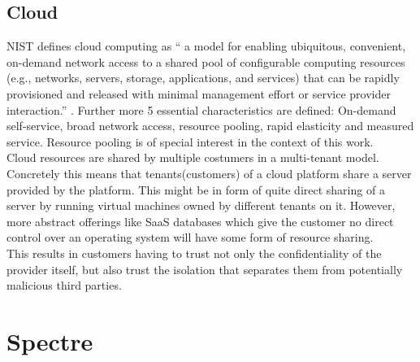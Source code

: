 \documentclass[conference,compsoc,final,a4paper]{IEEEtran}
\begin{document}
\subsection{Cloud}
NIST defines cloud computing as \enquote{\textelp{} a model for enabling ubiquitous, convenient, on-demand network access to a shared pool of configurable computing resources (e.g., networks, servers, storage, applications, and services) that can be rapidly provisioned and released with minimal management effort or service provider interaction.} \textcite{mell2011nist}. Further more 5 essential characteristics are defined: On-demand self-service, broad network access, resource pooling, rapid   elasticity and measured service. Resource pooling is of special interest in the context of this work. \\
Cloud resources are shared by multiple costumers in a multi-tenant model. \cite{mell2011nist} Concretely this means that tenants(customers) of a cloud platform share a server provided by the platform. This might be in form of quite direct sharing of a server by running virtual machines owned by different tenants on it. However, more abstract offerings like \ac{SaaS} databases which give the customer no direct control over an operating system will have some form of resource sharing. \\
This results in customers having to trust not only the confidentiality of the provider itself, but also trust the isolation that separates them from potentially malicious third parties.
\section{Spectre}
\end{document}
